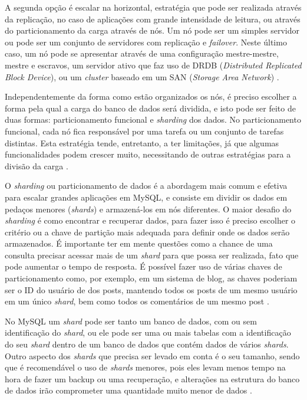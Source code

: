 \documentclass[diss]{template/setrem}
\begin{document}
A segunda opção é escalar na horizontal, estratégia que pode ser realizada através da replicação, no caso de aplicações com grande intensidade de leitura, ou através do particionamento da carga através de nós. Um nó pode ser um simples servidor ou pode ser um conjunto de servidores com replicação e \emph{failover}. Neste último caso, um nó pode se apresentar através de uma configuração mestre-mestre, mestre e escravos, um servidor ativo que faz uso de DRDB (\emph{Distributed Replicated Block Device}), ou um \emph{cluster} baseado em um SAN (\emph{Storage Area Network}) \citep{Schwartz2008}.

Independentemente da forma como estão organizados os nós, é preciso escolher a forma pela qual a carga do banco de dados será dividida, e isto pode ser feito de duas formas: particionamento funcional e \emph{sharding} dos dados. No particionamento funcional, cada nó fica responsável por uma tarefa ou um conjunto de tarefas distintas. Esta estratégia tende, entretanto, a ter limitações, já que algumas funcionalidades podem crescer muito, necessitando de outras estratégias para a divisão da carga \citep{Schwartz2008}.

O \emph{sharding} ou particionamento de dados é a abordagem mais comum e efetiva para escalar grandes aplicações em MySQL, e consiste em dividir os dados em pedaços menores (\emph{shards}) e armazená-los em nós diferentes. O maior desafio do \emph{sharding} é como encontrar e recuperar dados, para fazer isso é preciso escolher o critério ou a chave de partição mais adequada para definir onde os dados serão armazenados. É importante ter em mente questões como a chance de uma consulta precisar acessar mais de um \emph{shard} para que possa ser realizada, fato que pode aumentar o tempo de resposta. É possível fazer uso de várias chaves de particionamento como, por exemplo, em um sistema de blog, as chaves poderiam ser o ID do usuário de dos posts, mantendo todos os posts de um mesmo usuário em um único \emph{shard}, bem como todos os comentários de um mesmo post \citep{Schwartz2008}.

No MySQL um \emph{shard} pode ser tanto um banco de dados, com ou sem identificação do \emph{shard}, ou ele pode ser uma ou mais tabelas com a identificação do seu \emph{shard} dentro de um banco de dados que contém dados de vários \emph{shards}. Outro aspecto dos \emph{shards} que precisa ser levado em conta é o seu tamanho, sendo que é recomendável o uso de \emph{shards} menores, pois eles levam menos tempo na hora de fazer um backup ou uma recuperação, e alterações na estrutura do banco de dados irão comprometer uma quantidade muito menor de dados \citep{Schwartz2008}.
\end{document}
